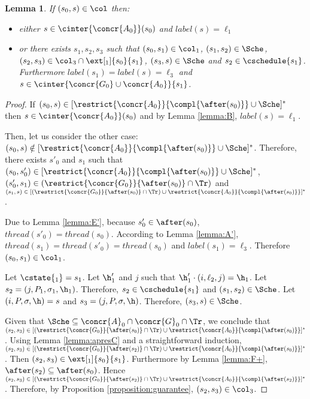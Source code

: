 \documentclass[12pt]{article}
\let\firstunion\cup
\let\firstinter\cap
\let\cup\firstunion
\let\cap\firstinter
\renewcommand{\subset}{\subseteq}
\newcommand{\lbl}{\mathit{label}}
\newcommand{\thread}{\mathit{thread}}
\newtheorem{lemma}{Lemma}
\begin{document}
\begin{lemma}\label{lemma:Ccr}
 If \((s_0,s)\in\col\) then:
 \begin{itemize}
  \item either \(s\in\cinter{\concr{A_0}}(s_0)\) and \(\lbl(s)=\ell_1\)
  \item or there exists \(s_1,s_2,s_3\) such that \((s_0,s_1)\in\col_1\), \((s_1,s_2)\in\Sche\), \((s_2,s_3)\in\col_3\cap\ext[_1]{s_0}{s_1}\), \((s_3,s)\in\Sche\) and \(s_2\in\cschedule\{s_1\}\). Furthermore \(\lbl(s_1)=\lbl(s)=\ell_3\) and \(s\in\cinter{\concr{G_0}\cup\concr{A_0}}\{s_1\}\).
 \end{itemize}
\end{lemma}
\begin{proof}
 
 If \((s_0,s)\in [\restrict{\concr{A_0}}{\compl{\after(s_0)}} \cup\Sche]^{\ast}\) then \(s\in\cinter{\concr{A_0}}(s_0)\) and by Lemma \ref{lemma:B}, \(\lbl(s)=\ell_1\).

Then, let us consider the other case: \((s_0,s)\notin [\restrict{\concr{A_0}}{\compl{\after(s_0)}} \cup\Sche]^{\ast}\). Therefore, there exists \(s'_0\) and \(s_1\) such that \((s_0,s'_{0})\in [\restrict{\concr{A_0}}{\compl{\after(s_0)}} \cup\Sche]^{\ast}\), \((s'_{0},s_{1})\in (\restrict{\concr{G_0}}{\after(s_0)}\cap\Tr)\) and  \((s_1,s)\in [(\restrict{\concr{G_0}}{\after(s_0)}\cap\Tr)\cup\restrict{\concr{A_0}}{\compl{\after(s_0)}}]^{\star}\).

 Due to Lemma \ref{lemma:E'}, because \(s'_{0}\in\after(s_0)\), \(\thread(s'_{0})=\thread(s_0)\).
 According to Lemma \ref{lemma:A'}, \(\thread(s_{1})=\thread(s'_{0})=\thread(s_0)\) and \(\lbl(s_{1})=\ell_3\). Therefore \((s_0,s_{1})\in\col_1\).
 
 Let \(\cstate{_1}=s_1\). Let \(\h'_1\) and \(j\) such that \(\h'_1\cdot(i,\ell_2,j)=\h_1\).
 Let \(s_2=(j,P_1,\m_1,\h_1)\). Therefore, \(s_2\in\cschedule\{s_1\}\) and \((s_1,s_2)\in\Sche\).
 Let \((i,P,\m,\h)=s\) and \(s_3=(j,P,\m,\h)\). Therefore, \((s_3,s)\in\Sche\).
 
 Given that \(\Sche\subset\concr{A}_0\cap\concr{G}_0\cap\Tr\), we conclude that \((s_2,s_3)\in [(\restrict{\concr{G_0}}{\after(s_0)}\cap\Tr)\cup\restrict{\concr{A_0}}{\compl{\after(s_0)}}]^{\star}\).
 Using Lemma \ref{lemma:apresC} and a straightforward induction, \((s_2,s_3)\in [(\restrict{\concr{G_0}}{\after(s_2)}\cap\Tr)\cup\restrict{\concr{A_0}}{\compl{\after(s_0)}}]^{\star}\).
 Then \((s_2,s_3)\in\ext[_1]{s_0}{s_1}\).
 Furthermore by Lemma \ref{lemma:F+}, \(\after(s_2)\subset\after(s_0)\). Hence \((s_2,s_3)\in [(\restrict{\concr{G_0}}{\after(s_2)}\cap\Tr)\cup\restrict{\concr{A_0}}{\compl{\after(s_2)}}]^{\star}\). Therefore, by Proposition \ref{proposition:guarantee}, \((s_2,s_3)\in\col_3\).
 \end{proof}
\end{document}
